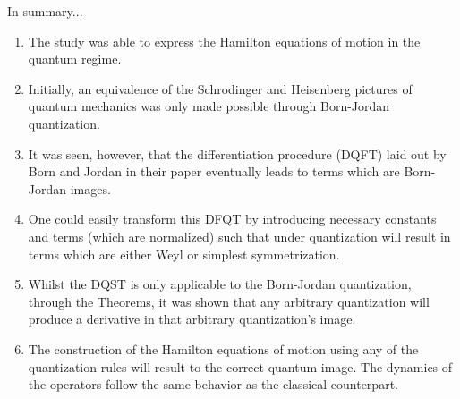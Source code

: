 \documentclass[aspectratio=169]{beamer}
\begin{document}
	\begin{frame}{In summary...}
		\begin{enumerate}
			\item The study was able to express the Hamilton equations of motion in the quantum regime.
			\item Initially, an equivalence of the Schrodinger and Heisenberg pictures of quantum mechanics was only made possible through Born-Jordan quantization.
			\item It was seen, however, that the differentiation procedure (DQFT) laid out by Born and Jordan in their paper eventually leads to terms which are Born-Jordan images.
			\item One could easily transform this DFQT by introducing necessary constants and terms (which are normalized) such that under quantization will result in terms which are either Weyl or simplest symmetrization.
			\item Whilst the DQST is only applicable to the Born-Jordan quantization, through the Theorems, it was shown that any arbitrary quantization will produce a derivative in that arbitrary quantization's image.
			\item The construction of the Hamilton equations of motion using any of the quantization rules will result to the correct quantum image. The dynamics of the operators follow the same behavior as the classical counterpart.
		\end{enumerate}
	\end{frame}
\end{document}
